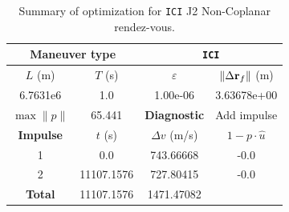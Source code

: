 \begin{table}[htpb]
    \centering
    \begin{tabular}{cccc} \toprule
    \multicolumn{2}{c}{\textbf{Maneuver type}} & \multicolumn{2}{c}{\texttt{ICI}} \\ \midrule
    \(L\) (m) & \(T\) (s) & \(\varepsilon\) & \(\lVert \Delta \mathbf{r}_{f} \rVert\) (m)    \\ \midrule
    6.7631e6          & 1.0          & 1.00e-06                & 3.63678e+00                        \\ \midrule
    \(\max \lVert p \rVert\) & 65.441     & \textbf{Diagnostic}   & Add impulse        \\ \midrule
    \textbf{Impulse} & \(t\) (s) & \(\Delta v\) (m/s) & \(1 - p \cdot \hat{u}\) \\ \midrule
    1                 & 0.0          & 743.66668             & -0.0                    \\
    2                 & 11107.1576          & 727.80415             & -0.0                    \\\midrule
    \textbf{Total}   & 11107.1576          & 1471.47082             &                     \\ \bottomrule   
    \end{tabular}
    \caption{Summary of optimization for \texttt{ICI} J2 Non-Coplanar rendez-vous.}
    \label{tab:J2_nr_ICI_tab}
\end{table}

